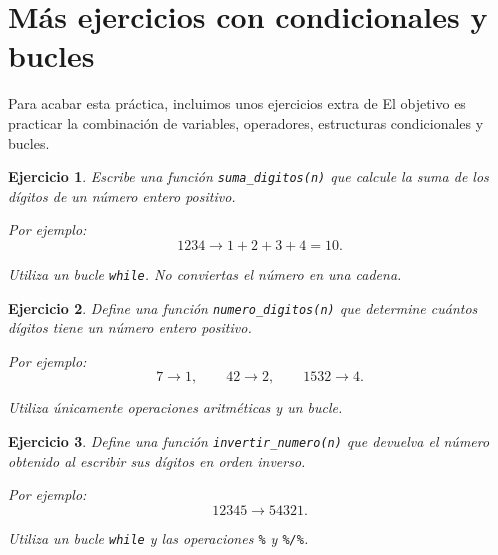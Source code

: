 \documentclass[11pt,a4paper]{article}
\theoremstyle{exercise}
\newtheorem{exercise}{Ejercicio}
\begin{document}
%










\iffalse

\section{Más ejercicios con condicionales y bucles} 

Para acabar esta práctica, incluimos unos ejercicios extra de  El objetivo es practicar la combinación de variables, operadores, estructuras condicionales y bucles.

\begin{exercise} Escribe una función \texttt{suma\_digitos(n)} que calcule la suma de los dígitos de un número entero positivo.

Por ejemplo: \[ 1234 \longrightarrow 1+2+3+4=10. \]

Utiliza un bucle \texttt{while}. No conviertas el número en una cadena. \end{exercise}

\begin{exercise} Define una función \texttt{numero\_digitos(n)} que determine cuántos dígitos tiene un número entero positivo.

Por ejemplo: \[ 7 \longrightarrow 1,\qquad 42 \longrightarrow 2,\qquad 1532 \longrightarrow 4. \]

Utiliza únicamente operaciones aritméticas y un bucle. \end{exercise}

\begin{exercise} Define una función \texttt{invertir\_numero(n)} que devuelva el número obtenido al escribir sus dígitos en orden inverso.

Por ejemplo: \[ 12345 \longrightarrow 54321. \]

Utiliza un bucle \texttt{while} y las operaciones \texttt{\%} y \texttt{\%/\%}. \end{exercise}
\end{document}
